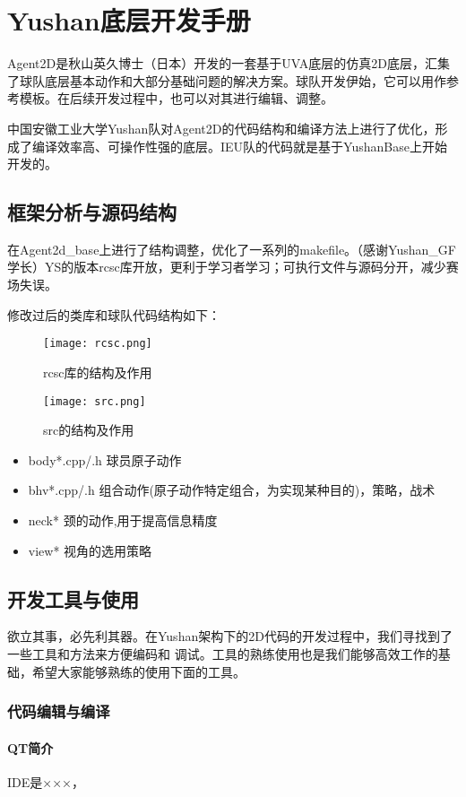 \chapter{Yushan底层开发手册}

Agent2D是秋山英久博士（日本）开发的一套基于UVA底层的仿真2D底层，汇集了球队底层基本动作和大部分基础问题的解决方案。球队开发伊始，它可以用作参考模板。在后续开发过程中，也可以对其进行编辑、调整。

中国安徽工业大学Yushan队对Agent2D的代码结构和编译方法上进行了优化，形成了编译效率高、可操作性强的底层。IEU队的代码就是基于YushanBase上开始开发的。
\section{框架分析与源码结构}

在Agent2d\_base上进行了结构调整，优化了一系列的makefile。（感谢Yushan\_GF学长）YS的版本rcsc库开放，更利于学习者学习；可执行文件与源码分开，减少赛场失误。

修改过后的类库和球队代码结构如下：
\begin{figure}[htb]
	\texttt{[image: rcsc.png]}
	\caption{rcsc库的结构及作用}
\end{figure}


\begin{figure}[H]
	\texttt{[image: src.png]}
	\caption{src的结构及作用}
\end{figure}

\begin{itemize}
	\item body*.cpp/.h	球员原子动作
	\item bhv*.cpp/.h	组合动作(原子动作特定组合，为实现某种目的)，策略，战术
	\item neck*		颈的动作,用于提高信息精度
	\item view*		视角的选用策略
\end{itemize}
\section{开发工具与使用}
欲立其事，必先利其器。在Yushan架构下的2D代码的开发过程中，我们寻找到了一些工具和方法来方便编码和
调试。工具的熟练使用也是我们能够高效工作的基础，希望大家能够熟练的使用下面的工具。
\subsection{代码编辑与编译}
\subsubsection{QT简介}
IDE是×××，

